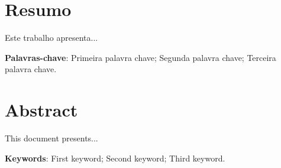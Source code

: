 
\chapter*{Resumo}
\thispagestyle{empty}

Este trabalho apresenta...

\vspace{1.5ex}

{\bf Palavras-chave}: 
Primeira palavra chave;
Segunda palavra chave;
Terceira palavra chave.


\chapter*{Abstract}
\thispagestyle{empty}

This document presents...

\vspace{1.5ex}

{\bf Keywords}:
First keyword;
Second keyword;
Third keyword.

